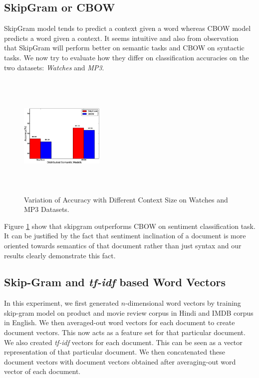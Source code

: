 \documentclass[11pt,a4paper]{article}
\begin{document}
\subsection{SkipGram or CBOW}
SkipGram model tends to predict a context given a word whereas CBOW model predicts a word given a context. It seems intuitive and also from observation~\cite{Mikolov:13b} that SkipGram will perform better on semantic tasks and CBOW on syntactic tasks. We now try to evaluate how they differ on classification accuracies on the two datasets: \emph{Watches} and \emph{MP3}.
\begin{figure}[ht!]
\centering
\includegraphics[width=40mm, height=60mm]{img/accuracy_sgcbow.eps}
\caption{Variation of Accuracy with Different Context Size on Watches and MP3 Datasets. \label{fig:accuracy_sgcbow}}
\end{figure}
Figure \ref{fig:accuracy_sgcbow} show that skipgram outperforms CBOW on sentiment classification task. It can be justified by the fact that sentiment inclination of a document is more oriented towards semantics of that document rather than just syntax and our results clearly demonstrate this fact.

\subsection{Skip-Gram and \emph{tf-idf} based Word Vectors}
In this experiment, we first generated $n$-dimensional word vectors by training skip-gram model on product and movie review corpus in Hindi and IMDB corpus in English. We then averaged-out word vectors for each document to create document vectors. This now acts as a feature set for that particular document.
We also created \emph{tf-idf} vectors for each document. This can be seen as a vector representation of that particular document. We then concatenated these document vectors with document vectors obtained after averaging-out word vector of each document.
\end{document}
